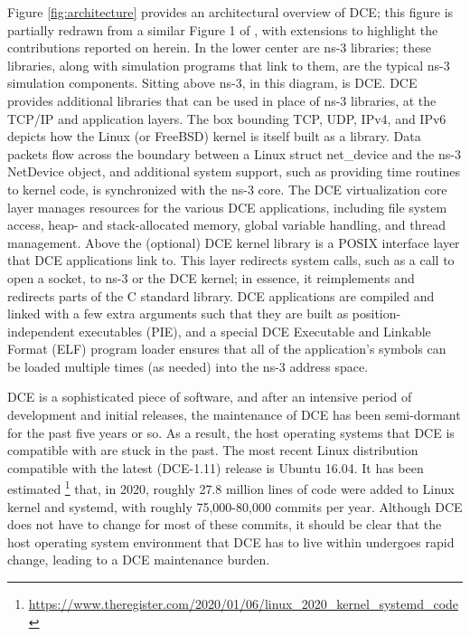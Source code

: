 \documentclass{sig-alternate}
\begin{document}
Figure \ref{fig:architecture} provides an architectural overview of DCE;
this figure is partially redrawn from a similar Figure 1 of \cite{Tazaki13},
with extensions to highlight the contributions reported on herein.
In the lower center are ns-3 libraries; these libraries, along with simulation
programs that link to them, are the typical ns-3 simulation components.
Sitting above ns-3, in this diagram, is DCE.  DCE provides additional
libraries that can be used in place of ns-3 libraries, at the TCP/IP and
application layers.  The box bounding TCP, UDP, IPv4, and IPv6 depicts 
how the Linux (or FreeBSD) kernel is itself built as a library.  Data
packets flow across the boundary between a Linux struct net\_device and
the ns-3 NetDevice object, and additional system support, such as providing
time routines to kernel code, is synchronized with the ns-3 core.
The DCE virtualization core layer manages resources for the various DCE
applications, including file system access, heap- and stack-allocated
memory, global variable handling, and thread management.
Above the (optional) DCE kernel library is a POSIX interface layer that
DCE applications link to.  This layer redirects system calls, such as a
call to open a socket, to ns-3 or the DCE kernel; in essence, it reimplements
and redirects parts of the C standard library.  DCE applications are compiled
and linked with a few extra arguments such that they are built as 
position-independent executables (PIE), and a special DCE Executable and
Linkable Format (ELF) program loader
ensures that all of the application's symbols can be loaded multiple times
(as needed) into the ns-3 address space.

\sloppy DCE is a sophisticated piece of software, and after an intensive period
of development and initial releases, the maintenance of DCE has been
semi-dormant for the past five years or so.  As a result, the host
operating systems that DCE is compatible with are stuck in the past.
The most recent Linux distribution compatible with the latest (DCE-1.11)
release is Ubuntu 16.04.  It has been estimated
\footnote{\url{https://www.theregister.com/2020/01/06/linux\_2020\_kernel\_systemd\_code}}
 that, in 2020, roughly 27.8 million lines of code were added to Linux
kernel and systemd, with roughly 75,000-80,000 commits per year. Although
DCE does not have to change for most of these commits, it should be clear
that the host operating system environment that DCE has to live within
undergoes rapid change, leading to a DCE maintenance burden.
\end{document}
